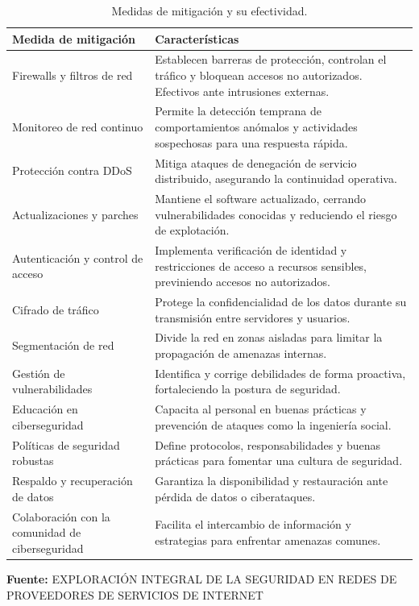 \documentclass[a4paper, 10pt]{article}
\begin{document}
\begin{table}[H]
    \centering
    \caption{Medidas de mitigación y su efectividad.}
    \begin{tabular}{p{4.5cm} p{10cm}}
    \toprule
    \textbf{Medida de mitigación} & \textbf{Características} \\
    \hline
    Firewalls y filtros de red & Establecen barreras de protección, controlan el tráfico y bloquean accesos no autorizados. Efectivos ante intrusiones externas. \\
    \bottomrule
    Monitoreo de red continuo & Permite la detección temprana de comportamientos anómalos y actividades sospechosas para una respuesta rápida. \\
    \bottomrule
    Protección contra DDoS & Mitiga ataques de denegación de servicio distribuido, asegurando la continuidad operativa. \\
    \bottomrule
    Actualizaciones y parches & Mantiene el software actualizado, cerrando vulnerabilidades conocidas y reduciendo el riesgo de explotación. \\
    \bottomrule
    Autenticación y control de acceso & Implementa verificación de identidad y restricciones de acceso a recursos sensibles, previniendo accesos no autorizados. \\
    \bottomrule
    Cifrado de tráfico & Protege la confidencialidad de los datos durante su transmisión entre servidores y usuarios. \\
    \bottomrule
    Segmentación de red & Divide la red en zonas aisladas para limitar la propagación de amenazas internas. \\
    \bottomrule
    Gestión de vulnerabilidades & Identifica y corrige debilidades de forma proactiva, fortaleciendo la postura de seguridad. \\
    \bottomrule
    Educación en ciberseguridad & Capacita al personal en buenas prácticas y prevención de ataques como la ingeniería social. \\
    \bottomrule
    Políticas de seguridad robustas & Define protocolos, responsabilidades y buenas prácticas para fomentar una cultura de seguridad. \\
    \bottomrule
    Respaldo y recuperación de datos & Garantiza la disponibilidad y restauración ante pérdida de datos o ciberataques. \\
    \bottomrule
    Colaboración con la comunidad de ciberseguridad & Facilita el intercambio de información y estrategias para enfrentar amenazas comunes. \\
    \bottomrule
    \end{tabular}
    \vspace{0.5em}
    \begin{flushleft}
    \footnotesize \textbf{Fuente:} EXPLORACIÓN INTEGRAL DE LA SEGURIDAD EN REDES DE PROVEEDORES DE SERVICIOS DE INTERNET \cite{mitigacion}
    \end{flushleft}
    \label{tab:medidas_mitigacion}
\end{table}
\end{document}
